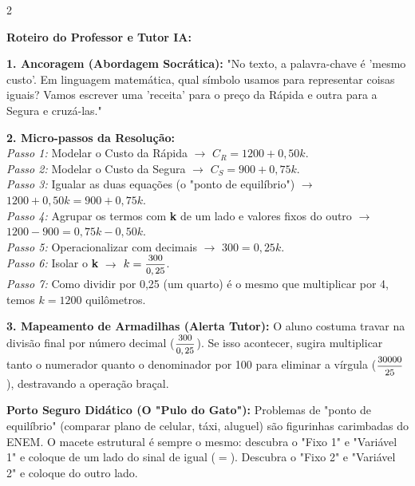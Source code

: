 \begin{multicols*}{2}
\ifgabarito
    \begin{tcolorbox}[colback=CorTitUm!5, colframe=CorTitUm, boxrule=1pt, arc=4pt, left=6pt, right=6pt, top=6pt, bottom=6pt]
    \small\textbf{\textcolor{CorTitUm}{Roteiro do Professor e Tutor IA:}}\par\vspace{0.1cm}
    \color{CinzaEscuro}
    \textbf{1. Ancoragem (Abordagem Socrática):} "No texto, a palavra-chave é 'mesmo custo'. Em linguagem matemática, qual símbolo usamos para representar coisas iguais? Vamos escrever uma 'receita' para o preço da Rápida e outra para a Segura e cruzá-las."\par\vspace{0.1cm}
    
    \textbf{2. Micro-passos da Resolução:}\\
    \textit{Passo 1:} Modelar o Custo da Rápida $\rightarrow$ $C_R = 1200 + 0,50k$.\\
    \textit{Passo 2:} Modelar o Custo da Segura $\rightarrow$ $C_S = 900 + 0,75k$.\\
    \textit{Passo 3:} Igualar as duas equações (o "ponto de equilíbrio") $\rightarrow$ $1200 + 0,50k = 900 + 0,75k$.\\
    \textit{Passo 4:} Agrupar os termos com \textbf{k} de um lado e valores fixos do outro $\rightarrow$ $1200 - 900 = 0,75k - 0,50k$.\\
    \textit{Passo 5:} Operacionalizar com decimais $\rightarrow$ $300 = 0,25k$.\\
    \textit{Passo 6:} Isolar o \textbf{k} $\rightarrow$ $k = \mfrac{300}{0,25}$.\\
    \textit{Passo 7:} Como dividir por 0,25 (um quarto) é o mesmo que multiplicar por 4, temos $k = 1200$ quilômetros.\par\vspace{0.1cm}
    
    \textbf{3. Mapeamento de Armadilhas (Alerta Tutor):} O aluno costuma travar na divisão final por número decimal ($\mfrac{300}{0,25}$). Se isso acontecer, sugira multiplicar tanto o numerador quanto o denominador por 100 para eliminar a vírgula ($\mfrac{30000}{25}$), destravando a operação braçal.
    \end{tcolorbox}
    \vspace{0.15cm}
    
    \begin{boxexplicacao}
    \textbf{Porto Seguro Didático (O "Pulo do Gato"):} Problemas de "ponto de equilíbrio" (comparar plano de celular, táxi, aluguel) são figurinhas carimbadas do ENEM. O macete estrutural é sempre o mesmo: descubra o "Fixo 1" e "Variável 1" e coloque de um lado do sinal de igual ($=$). Descubra o "Fixo 2" e "Variável 2" e coloque do outro lado. 
    \end{boxexplicacao}
\fi


\end{multicols*}
